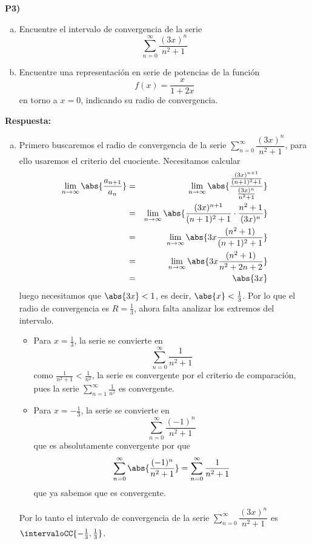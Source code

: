 \documentclass{article}
\begin{document}
\newpage
\noindent\textbf{P3) }
\begin{enumerate}[a)]
  \item Encuentre el intervalo de convergencia de la serie 
    $$\displaystyle\sum_{n=0}^{\infty}\dfrac{(3x)^n}{n^2+1}$$
  \item Encuentre una representación en serie de potencias de la función 
    $$f(x)=\dfrac{x}{1+2x}$$
    en torno a $x=0$, indicando su radio de convergencia.
\end{enumerate}

\vspace{0.25cm}
\noindent\textbf{Respuesta:} 
\begin{enumerate}[a)]
  \item Primero buscaremos el radio de convergencia de la serie $\displaystyle\sum_{n=0}^{\infty}\dfrac{(3x)^n}{n^2+1}$, para ello usaremos el criterio del cuociente. Necesitamos calcular
    \begin{eqnarray*}
      \lim_{n\to\infty}\abs{\dfrac{a_{n+1}}{a_n}} 
        &=& \lim_{n\to\infty}\abs{\dfrac{\frac{(3x)^{n+1}}{(n+1)^2+1}}{\frac{(3x)^n}{n^2+1}}}\\
        &=& \lim_{n\to\infty}\abs{\dfrac{(3x)^{n+1}}{(n+1)^2+1}\cdot\dfrac{n^2+1}{(3x)^n}}\\
        &=& \lim_{n\to\infty}\abs{3x\dfrac{(n^2+1)}{(n+1)^2+1}}\\
        &=& \lim_{n\to\infty}\abs{3x\dfrac{(n^2+1)}{n^2+2n+2}}\\
        &=& \abs{3x}
    \end{eqnarray*}
    luego necesitamos que $\abs{3x}<1$, es decir, $\abs{x}<\frac{1}{3}$. Por lo que el radio de convergencia es $R=\frac{1}{3}$, ahora falta analizar los extremos del intervalo.\\
    \begin{itemize}
      \item Para $x=\frac{1}{3}$, la serie se convierte en
        $$\displaystyle\sum_{n=0}^{\infty}\dfrac{1}{n^2+1}$$
        como $\frac{1}{n^2+1}<\frac{1}{n^2}$, la serie es convergente por el criterio de comparación, pues la serie $\displaystyle\sum_{n=1}^{\infty}\frac{1}{n^2}$ es convergente.
      \item Para $x=-\frac{1}{3}$, la serie se convierte en
        $$\displaystyle\sum_{n=0}^{\infty}\dfrac{(-1)^n}{n^2+1}$$
        que es absolutamente convergente por que
        $$\sum_{n=0}^{\infty}\abs{\dfrac{(-1)^n}{n^2+1}}=\sum_{n=0}^{\infty}\dfrac{1}{n^2+1}$$
        que ya sabemos que es convergente.
    \end{itemize}
    Por lo tanto el intervalo de convergencia de la serie $\displaystyle\sum_{n=0}^{\infty}\dfrac{(3x)^n}{n^2+1}$ es $\intervaloCC{-\frac{1}{3},\frac{1}{3}}$.


\end{enumerate}
\end{document}
